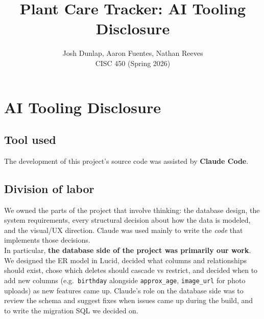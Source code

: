 \documentclass[11pt]{article}
\title{Plant Care Tracker: AI Tooling Disclosure}
\author{Josh Dunlap, Aaron Fuentes, Nathan Reeves \\ CISC 450 (Spring 2026)}
\date{}
\begin{document}
\maketitle
\section*{AI Tooling Disclosure}
\subsection*{Tool used}
The development of this project's source code was assisted by \textbf{Claude
Code}.
\subsection*{Division of labor}
We owned the parts of the project that involve thinking: the
database design, the system requirements, every structural decision about
how the data is modeled, and the visual/UX direction. Claude was used
mainly to write the \emph{code} that implements those decisions.\\

\noindent In particular, \textbf{the database side of the project was primarily our work}. We designed the ER model in Lucid, decided what columns and relationships should exist, chose which deletes should cascade vs
restrict, and decided when to add new columns (e.g.\ \texttt{birthday} alongside
\texttt{approx\_age}, \texttt{image\_url} for photo uploads) as new features came up.
Claude's role on the database side was to review the schema and suggest
fixes when issues came up during the build, and to write the migration
SQL we decided on.
\end{document}
